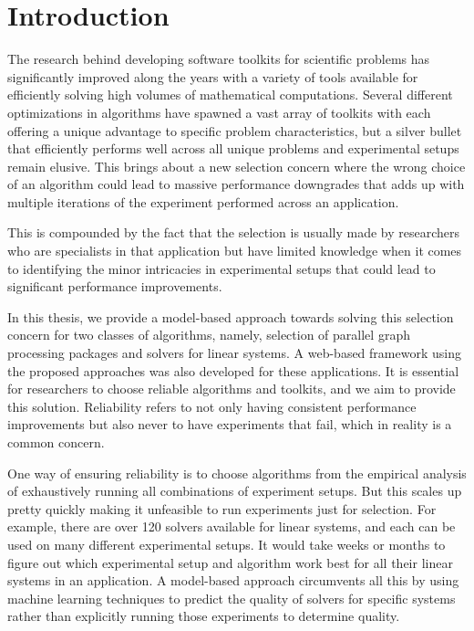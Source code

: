 %   
\chapter{Introduction} 
The research behind developing software toolkits for scientific problems has significantly improved along the years with a variety of tools available for efficiently solving high volumes of mathematical computations. Several different optimizations in algorithms have spawned a vast array of toolkits with each offering a unique advantage to specific problem characteristics, but a silver bullet that efficiently performs well across all unique problems and experimental setups remain elusive. This brings about a new selection concern where the wrong choice of an algorithm could lead to massive performance downgrades that adds up with multiple iterations of the experiment performed across an application. 

This is compounded by the fact that the selection is usually made by researchers who are specialists in that application but have limited knowledge when it comes to identifying the minor intricacies in experimental setups that could lead to significant performance improvements.

In this thesis, we provide a model-based approach towards solving this selection concern for two classes of algorithms, namely, selection of parallel graph processing packages and solvers for linear systems. A web-based framework using the proposed approaches was also developed for these applications. It is essential for researchers to choose reliable algorithms and toolkits, and we aim to provide this solution. Reliability refers to not only having consistent performance improvements but also never to have experiments that fail, which in reality is a common concern.

One way of ensuring reliability is to choose algorithms from the empirical analysis of exhaustively running all combinations of experiment setups. But this scales up pretty quickly making it unfeasible to run experiments just for selection. For example, there are over 120 solvers available for linear systems, and each can be used on many different experimental setups. It would take weeks or months to figure out which experimental setup and algorithm work best for all their linear systems in an application. A model-based approach circumvents all this by using machine learning techniques to predict the quality of solvers for specific systems rather than explicitly running those experiments to determine quality.

